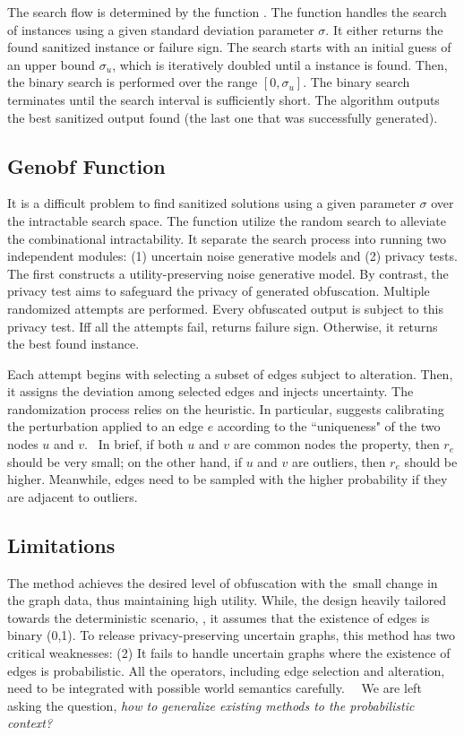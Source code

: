 The search flow is determined by the function {\genobf}. The function {\genobf} handles the search of {\keobf} instances using a given standard deviation parameter $\sigma$. It either returns the found sanitized instance or failure sign.
The search starts with an initial guess of an upper bound $\sigma_{u}$, which is iteratively doubled until a {\keobf} instance is found. Then, the binary search is performed over the range $[0,\sigma_{u}]$. The binary search terminates until the search interval is sufficiently short. The algorithm outputs the best sanitized output found (the last one that was successfully generated).

\subsection{Genobf Function}
It is a difficult problem to find {\keobf} sanitized solutions using a given parameter $\sigma$ over the intractable search space. 
The function {\genobf} utilize the random search to alleviate the combinational intractability. 
It separate the search process into running two independent modules: (1) uncertain noise generative models and (2) privacy tests. 
The first constructs a utility-preserving noise generative model. 
By contrast, the privacy test aims to safeguard the privacy of generated obfuscation.  
Multiple randomized attempts are performed. 
Every obfuscated output is subject to this privacy test. 
Iff all the attempts fail, {\genobf} returns failure sign. Otherwise, it returns the best found {\keobf} instance. 

Each attempt begins with selecting a subset of edges subject to alteration. 
Then, it assigns the deviation among selected edges and injects uncertainty. 
The randomization process relies on the heuristic.  
In particular, {\soaName} suggests calibrating the perturbation applied to an edge $e$ according to the ``uniqueness" of the two nodes $u$ and $v$. 
In brief, if both $u$ and $v$ are common nodes {\wrt} the property, then $r_{e}$ should be very small; 
on the other hand, if $u$ and $v$ are outliers, then $r_{e}$ should be higher. 
Meanwhile, edges need to be sampled with the higher probability if they are adjacent to outliers. 

\subsection{Limitations} 
The {\soaName} method achieves the desired level of obfuscation with the small change in the graph data, thus maintaining high utility.
While, the design heavily tailored towards the deterministic scenario, {\eg}, it assumes that the existence of edges is binary (0,1).
To release privacy-preserving uncertain graphs, this method has two critical weaknesses: 
(2) It fails to handle uncertain graphs where the existence of edges is probabilistic. 
All the operators, including edge selection and alteration, need to be integrated with possible world semantics carefully.  
We are left asking the question, \emph{how to generalize existing methods to the probabilistic context?}



